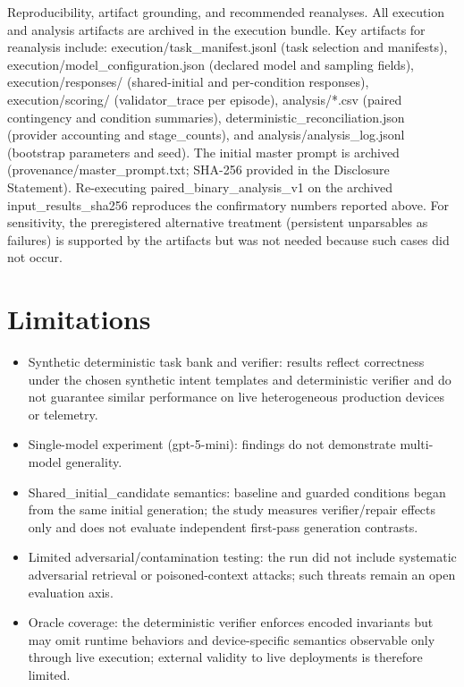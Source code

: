 \documentclass[conference]{IEEEtran}
\begin{document}
Reproducibility, artifact grounding, and recommended reanalyses. All execution and analysis artifacts are archived in the execution bundle. Key artifacts for reanalysis include: execution/task\_manifest.jsonl (task selection and manifests), execution/model\_configuration.json (declared model and sampling fields), execution/responses/ (shared-initial and per-condition responses), execution/scoring/ (validator\_trace per episode), analysis/*.csv (paired contingency and condition summaries), deterministic\_reconciliation.json (provider accounting and stage\_counts), and analysis/analysis\_log.jsonl (bootstrap parameters and seed). The initial master prompt is archived (provenance/master\_prompt.txt; SHA-256 provided in the Disclosure Statement). Re-executing paired\_binary\_analysis\_v1 on the archived input\_results\_sha256 reproduces the confirmatory numbers reported above. For sensitivity, the preregistered alternative treatment (persistent unparsables as failures) is supported by the artifacts but was not needed because such cases did not occur.

\section{Limitations}
\begin{itemize}
\item Synthetic deterministic task bank and verifier: results reflect correctness under the chosen synthetic intent templates and deterministic verifier and do not guarantee similar performance on live heterogeneous production devices or telemetry.
\item Single-model experiment (gpt-5-mini): findings do not demonstrate multi-model generality.
\item Shared\_initial\_candidate semantics: baseline and guarded conditions began from the same initial generation; the study measures verifier/repair effects only and does not evaluate independent first-pass generation contrasts.
\item Limited adversarial/contamination testing: the run did not include systematic adversarial retrieval or poisoned-context attacks; such threats remain an open evaluation axis.
\item Oracle coverage: the deterministic verifier enforces encoded invariants but may omit runtime behaviors and device-specific semantics observable only through live execution; external validity to live deployments is therefore limited.
\end{itemize}
\end{document}
